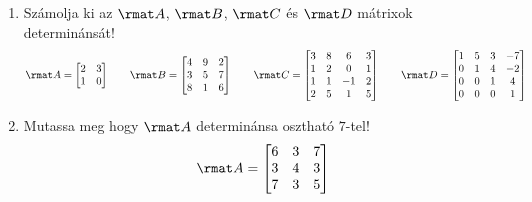 \documentclass[a4paper, 12pt]{scrartcl}
\begin{document}
\begin{enumerate}
  \item Számolja ki az $\rmat A$, $\rmat B$, $\rmat C$ és $\rmat D$ mátrixok
        determinánsát!
        $$
          \rmat A = \begin{bmatrix}
            2 & 3 \\
            1 & 0
          \end{bmatrix}
          \qquad
          \rmat B = \begin{bmatrix}
            4 & 9 & 2 \\
            3 & 5 & 7 \\
            8 & 1 & 6
          \end{bmatrix}
          \qquad
          \rmat C = \begin{bmatrix}
            3 & 8 & 6  & 3 \\
            1 & 2 & 0  & 1 \\
            1 & 1 & -1 & 2 \\
            2 & 5 & 1  & 5
          \end{bmatrix}
          \qquad
          \rmat D = \begin{bmatrix}
            1 & 5 & 3 & -7 \\
            0 & 1 & 4 & -2 \\
            0 & 0 & 1 & 4  \\
            0 & 0 & 0 & 1
          \end{bmatrix}
        $$

  \item  Mutassa meg hogy $\rmat A$ determinánsa osztható $7$-tel!
        $$
          \rmat A = \begin{bmatrix}
            6 & 3 & 7 \\
            3 & 4 & 3 \\
            7 & 3 & 5
          \end{bmatrix}
        $$
\end{enumerate}
\end{document}
